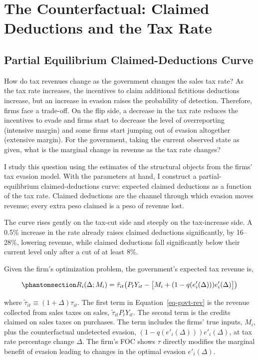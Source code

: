 \documentclass[
  12pt,
  letterpaper,
  oneside,
  openany]{report}
\begin{document}

\chapter{The Counterfactual: Claimed Deductions and the Tax
Rate}\label{sec-counterfactual}

\section{Partial Equilibrium Claimed-Deductions
Curve}\label{sec-cf-question}

How do tax revenues change as the government changes the sales tax rate?
As the tax rate increases, the incentives to claim additional fictitious
deductions increase, but an increase in evasion raises the probability
of detection. Therefore, firms face a trade-off. On the flip side, a
decrease in the tax rate reduces the incentives to evade and firms start
to decrease the level of overreporting (intensive margin) and some firms
start jumping out of evasion altogether (extensive margin). For the
government, taking the current observed state as given, what is the
marginal change in revenue as the tax rate changes?

I study this question using the estimates of the structural objects from
the firms' tax evasion model. With the parameters at hand, I construct a
partial-equilibrium claimed-deductions curve: expected claimed
deductions as a function of the tax rate. Claimed deductions are the
channel through which evasion moves revenue; every extra peso claimed is
a peso of revenue lost.

The curve rises gently on the tax-cut side and steeply on the
tax-increase side. A 0.5\% increase in the rate already raises claimed
deductions significantly, by 16--28\%, lowering revenue, while claimed
deductions fall significantly below their current level only after a cut
of at least 8\%.

Given the firm's optimization problem, the government's expected tax
revenue is,

\begin{equation}\protect\phantomsection\label{eq-govt-rev}{
R_i(\Delta;M_i) = \tilde\tau_{it}\big(P_tY_{it} - \big[M_i+(1-q(e'_i(\Delta)))e'_i(\Delta)\big]\big)
}\end{equation}

where \(\tilde\tau_{it}\equiv(1+\Delta)\tau_{it}\). The first term in
Equation~\ref{eq-govt-rev} is the revenue collected from sales taxes on
sales, \(\tilde\tau_{it}P_tY_{it}\). The second term is the credits
claimed on sales taxes on purchases. The term includes the firms' true
inputs, \(M_i\), plus the counterfactual undetected evasion,
\((1-q(e'_i(\Delta)))e'_i(\Delta)\), at tax rate percentage change
\(\Delta\). The firm's FOC shows \(\tau\) directly modifies the marginal
benefit of evasion leading to changes in the optimal evasion
\(e'_i(\Delta)\).
\end{document}
